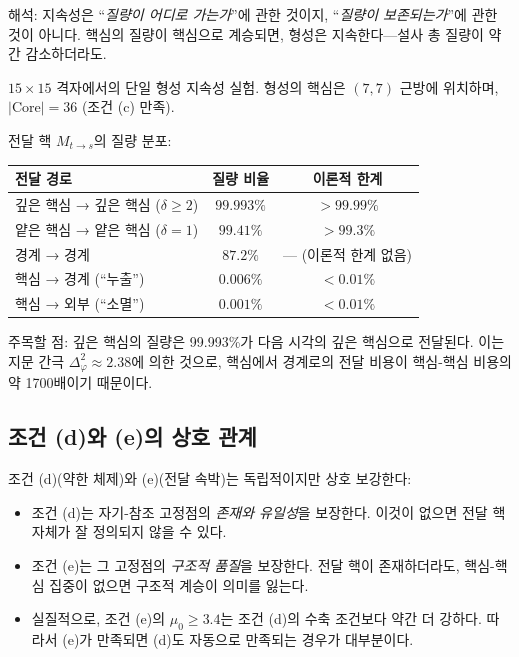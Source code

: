 해석: 지속성은 ``\emph{질량이 어디로 가는가}''에 관한 것이지, ``\emph{질량이 보존되는가}''에 관한 것이 아니다. 핵심의 질량이 핵심으로 계승되면, 형성은 지속한다---설사 총 질량이 약간 감소하더라도.

\begin{example}
\label{ex:two-tier-numerical}
$15 \times 15$ 격자에서의 단일 형성 지속성 실험. 형성의 핵심은 $(7,7)$ 근방에 위치하며, $|\mathrm{Core}| = 36$ (조건 (c) 만족).

전달 핵 $M_{t \to s}$의 질량 분포:
\begin{center}
\begin{tabular}{lcc}
\hline
\textbf{전달 경로} & \textbf{질량 비율} & \textbf{이론적 한계} \\
\hline
깊은 핵심 → 깊은 핵심 ($\delta \geq 2$) & $99.993\%$ & $> 99.99\%$ \\
얕은 핵심 → 얕은 핵심 ($\delta = 1$) & $99.41\%$ & $> 99.3\%$ \\
경계 → 경계 & $87.2\%$ & --- (이론적 한계 없음) \\
핵심 → 경계 (``누출'') & $0.006\%$ & $< 0.01\%$ \\
핵심 → 외부 (``소멸'') & $0.001\%$ & $< 0.01\%$ \\
\hline
\end{tabular}
\end{center}

주목할 점: 깊은 핵심의 질량은 99.993\%가 다음 시각의 깊은 핵심으로 전달된다. 이는 지문 간극 $\Delta_\varphi^2 \approx 2.38$에 의한 것으로, 핵심에서 경계로의 전달 비용이 핵심-핵심 비용의 약 1700배이기 때문이다.
\end{example}

\subsection{조건 (d)와 (e)의 상호 관계}

조건 (d)(약한 체제)와 (e)(전달 속박)는 독립적이지만 상호 보강한다:

\begin{itemize}
    \item 조건 (d)는 자기-참조 고정점의 \emph{존재와 유일성}을 보장한다. 이것이 없으면 전달 핵 자체가 잘 정의되지 않을 수 있다.
    \item 조건 (e)는 그 고정점의 \emph{구조적 품질}을 보장한다. 전달 핵이 존재하더라도, 핵심-핵심 집중이 없으면 구조적 계승이 의미를 잃는다.
    \item 실질적으로, 조건 (e)의 $\mu_0 \geq 3.4$는 조건 (d)의 수축 조건보다 약간 더 강하다. 따라서 (e)가 만족되면 (d)도 자동으로 만족되는 경우가 대부분이다.
\end{itemize}

